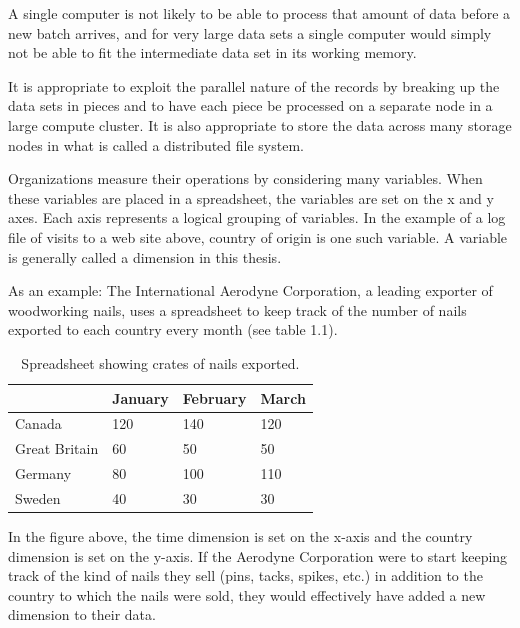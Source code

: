 A single computer is not likely to be able to process that amount of data
before a new batch arrives, and for very large data sets a single computer
would simply not be able to fit the intermediate data set in its working
memory.

It is appropriate to exploit the parallel nature of the records by breaking up
the data sets in pieces and to have each piece be processed on a separate node
in a large compute cluster. It is also appropriate to store the data across
many storage nodes in what is called a distributed file system.



Organizations measure their operations by considering many variables. When
these variables are placed in a spreadsheet, the variables are set on the x and
y axes. Each axis represents a logical grouping of variables. In the example of
a log file of visits to a web site above, country of origin is one such
variable. A variable is generally called a dimension in this thesis.

As an example: The International Aerodyne Corporation, a leading exporter of
woodworking nails, uses a spreadsheet to keep track of the number of nails
exported to each country every month (see table 1.1).

\begin{table}[h]
    \begin{center}
        \begin{tabular}{|l|l|l|l|}
        \hline
         & January & February & March \\
        \hline
        Canada & 120 & 140 & 120 \\
        \hline
        Great Britain & 60 & 50 & 50 \\
        \hline
        Germany & 80 & 100 & 110 \\
        \hline
        Sweden & 40 & 30 & 30 \\
        \hline
        \end{tabular}
        \caption{Spreadsheet showing crates of nails exported.}
    \end{center}
\end{table}

\vspace{-12pt}

In the figure above, the time dimension is set on the x-axis and the country
dimension is set on the y-axis. If the Aerodyne Corporation were to start
keeping track of the kind of nails they sell (pins, tacks, spikes, etc.) in
addition to the country to which the nails were sold, they would effectively
have added a new dimension to their data.

